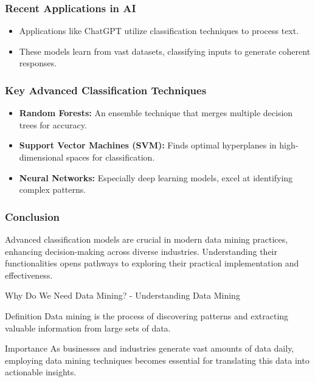 \documentclass[aspectratio=169]{beamer}
\begin{document}
\begin{frame}[fragile]
    \frametitle{Recent Applications in AI}
    \begin{itemize}
        \item Applications like ChatGPT utilize classification techniques to process text.
        \item These models learn from vast datasets, classifying inputs to generate coherent responses.
    \end{itemize}
\end{frame}

\begin{frame}[fragile]
    \frametitle{Key Advanced Classification Techniques}
    \begin{itemize}
        \item \textbf{Random Forests:} An ensemble technique that merges multiple decision trees for accuracy.
        \item \textbf{Support Vector Machines (SVM):} Finds optimal hyperplanes in high-dimensional spaces for classification.
        \item \textbf{Neural Networks:} Especially deep learning models, excel at identifying complex patterns.
    \end{itemize}
\end{frame}

\begin{frame}[fragile]
    \frametitle{Conclusion}
    Advanced classification models are crucial in modern data mining practices, enhancing decision-making across diverse industries. Understanding their functionalities opens pathways to exploring their practical implementation and effectiveness.
\end{frame}

\begin{frame}[fragile]{Why Do We Need Data Mining? - Understanding Data Mining}
    \begin{block}{Definition}
        Data mining is the process of discovering patterns and extracting valuable information from large sets of data. 
    \end{block}
    
    \begin{block}{Importance}
        As businesses and industries generate vast amounts of data daily, employing data mining techniques becomes essential for translating this data into actionable insights.
    \end{block}
\end{frame}
\end{document}
